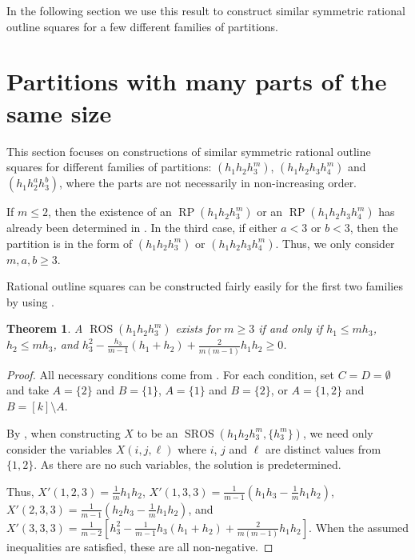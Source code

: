 \documentclass[preprint,nonatbib]{elsarticle}
\DeclareMathOperator{\LS}{RP}
\DeclareMathOperator{\ROS}{ROS}
\DeclareMathOperator{\SROS}{SROS}
\newtheorem{theorem}{Theorem}[section]
\theoremstyle{definition}
\numberwithin{equation}{section}
\begin{document}
In the following section we use this result to construct similar symmetric rational outline squares for a few different families of partitions.




\section{Partitions with many parts of the same size}

This section focuses on constructions of similar symmetric rational outline squares for different families of partitions: $(h_1h_2h_3^m)$, $(h_1h_2h_3h_4^m)$ and $(h_1h_2^ah_3^b)$, where the parts are not necessarily in non-increasing order.

If $m\leq 2$, then the existence of an $\LS(h_1h_2h_3^m)$ or an $\LS(h_1h_2h_3h_4^m)$ has already been determined in . In the third case, if either $a<3$ or $b<3$, then the partition is in the form of $(h_1h_2h_3^m)$ or $(h_1h_2h_3h_4^m)$. Thus, we only consider $m,a,b\geq 3$. 

Rational outline squares can be constructed fairly easily for the first two families by using .

\begin{theorem}
\label{thm: h_1h_2h_3^m rational}
    A $\ROS(h_1h_2h_3^m)$ exists for $m\geq 3$ if and only if $h_1\leq mh_3$, $h_2\leq mh_3$, and $h_3^2 - \frac{h_3}{m-1}(h_1+h_2) + \frac{2}{m(m-1)}h_1h_2 \geq 0$.
\end{theorem}
\begin{proof}
    All necessary conditions come from . For each condition, set $C = D = \emptyset$ and take $A = \{2\}$ and $B = \{1\}$, $A = \{1\}$ and $B = \{2\}$, or $A = \{1,2\}$ and $B = [k]\setminus A$.
    
    By , when constructing $X$ to be an $\SROS(h_1h_2h_3^m,\{h_3^m\})$, we need only consider the variables $X(i,j,\ell)$ where $i$, $j$ and $\ell$ are distinct values from $\{1,2\}$. As there are no such variables, the solution is predetermined.

    Thus, $X'(1,2,3) = \frac{1}{m}h_1h_2$, $X'(1,3,3) = \frac{1}{m-1}(h_1h_3 - \frac{1}{m}h_1h_2)$, $X'(2,3,3) = \frac{1}{m-1}(h_2h_3 - \frac{1}{m}h_1h_2)$, and $X'(3,3,3) = \frac{1}{m-2}[h_3^2 - \frac{1}{m-1}h_3(h_1+h_2) + \frac{2}{m(m-1)}h_1h_2]$. When the assumed inequalities are satisfied, these are all non-negative.
\end{proof}
\end{document}
